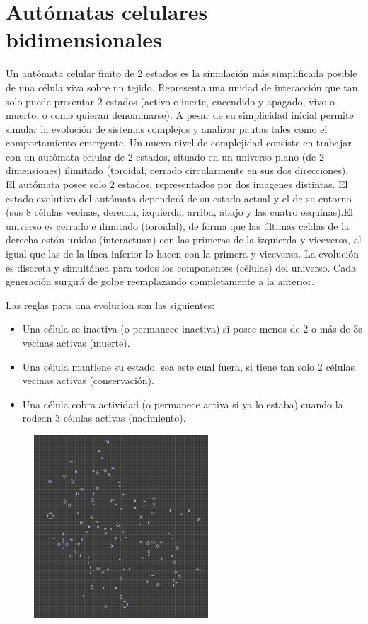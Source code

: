 \documentclass[11pt]{article}
\begin{document}
\section{Autómatas celulares bidimensionales}

    Un autómata celular finito de 2 estados es la simulación más simplificada posible de una célula viva sobre un tejido. Representa una unidad de interacción que tan solo puede presentar 2 estados (activo e inerte, encendido y apagado, vivo o muerto, o como quieran denominarse). A pesar de su simplicidad inicial permite simular la evolución de sistemas complejos y analizar pautas tales como el comportamiento emergente.
    Un nuevo nivel de complejidad consiste en trabajar con un autómata celular de 2 estados, situado en un universo plano (de 2 dimensiones) ilimitado (toroidal, cerrado circularmente en sus dos direcciones).\\
    
    
El autómata posee solo 2 estados, representados por dos imagenes distintas. El estado evolutivo del autómata dependerá de su estado actual y el de su entorno (sus 8 células vecinas, derecha, izquierda, arriba, abajo y las cuatro esquinas).El universo es cerrado e ilimitado (toroidal), de forma que las últimas celdas de la derecha están unidas (interactuan) con las primeras de la izquierda y viceversa, al igual que las de la línea inferior lo hacen con la primera y viceversa. La evolución es discreta y simultánea para todos los componentes (células) del universo. Cada generación surgirá de golpe reemplazando completamente a la anterior.

\clearpage

Las reglas para una evolucion son las siguientes:
\begin{itemize}
\item Una célula se inactiva (o permanece inactiva) si posee menos de 2 o más de 3s vecinas activas (muerte).
\item Una célula mantiene su estado, sea este cual fuera, si tiene tan solo 2 células vecinas activas (conservación).
\item Una célula cobra actividad (o permanece activa si ya lo estaba) cuando la rodean 3 células activas (nacimiento).
\end{itemize}

\begin{figure}[htp]
\centering
\includegraphics[width=6.5cm]{8.jpg}
\label{fig:lion}
\end{figure}
\end{document}
